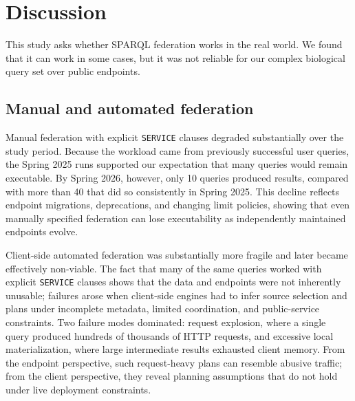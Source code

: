 \documentclass[runningheads]{llncs}
\begin{document}
\section{Discussion}\label{sec6}

This study asks whether SPARQL federation works in the real world. 
We found that it can work in some cases, but it was not reliable for our complex biological query set over public endpoints.

\subsection{Manual and automated federation}\label{sec6.1}
Manual federation with explicit \texttt{SERVICE} clauses degraded substantially over the study period. 
Because the workload came from previously successful user queries, the Spring 2025 runs supported our expectation that many queries would remain executable. 
By Spring 2026, however, only 10 queries produced results, compared with more than 40 that did so consistently in Spring 2025. 
This decline reflects endpoint migrations, deprecations, and changing limit policies, showing that even manually specified federation can lose executability as independently maintained endpoints evolve.

Client-side automated federation was substantially more fragile and later became effectively non-viable. 
The fact that many of the same queries worked with explicit \texttt{SERVICE} clauses shows that the data and endpoints were not inherently unusable; failures arose when client-side engines had to infer source selection and plans under incomplete metadata, limited coordination, and public-service constraints. 
Two failure modes dominated: request explosion, where a single query produced hundreds of thousands of HTTP requests, and excessive local materialization, where large intermediate results exhausted client memory. 
From the endpoint perspective, such request-heavy plans can resemble abusive traffic; from the client perspective, they reveal planning assumptions that do not hold under live deployment constraints.
\end{document}
